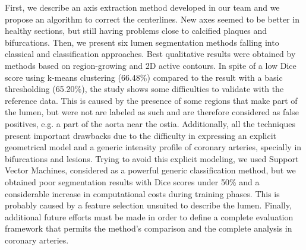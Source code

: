 \documentclass[a4paper, 11pt, oneside]{Thesis}  %
\begin{document}
{First, we describe an axis extraction method developed in our team and we propose an algorithm to correct the centerlines. New axes seemed to be better in healthy sections, but still having problems close to calcified plaques and bifurcations. Then, we present six lumen segmentation methods falling into classical and classification approaches. Best qualitative results were obtained by methods based on region-growing and 2D active contours. In spite of a low Dice score using k-means clustering (66.48\%) compared to the result with a basic thresholding (65.20\%), the study shows some difficulties to validate with the reference data. This is caused by the presence of some regions that make part of the lumen, but were not are labeled as such and are therefore considered as false positives, e.g. a part of the aorta near the ostia. Additionally, all the techniques present important drawbacks due to the difficulty in expressing an explicit geometrical model and a generic intensity profile of coronary arteries, specially in bifurcations and lesions. Trying to avoid this explicit modeling, we used Support Vector Machines, considered as a powerful generic classification method, but we obtained poor segmentation results with Dice scores under 50\% and a considerable increase in computational costs during training phases. This is probably caused by a feature selection unsuited to describe the lumen. Finally, additional future efforts must be made in order to define a complete evaluation framework that  permits the method's comparison and the complete analysis in coronary arteries. 

}

\clearpage  %
\end{document}
